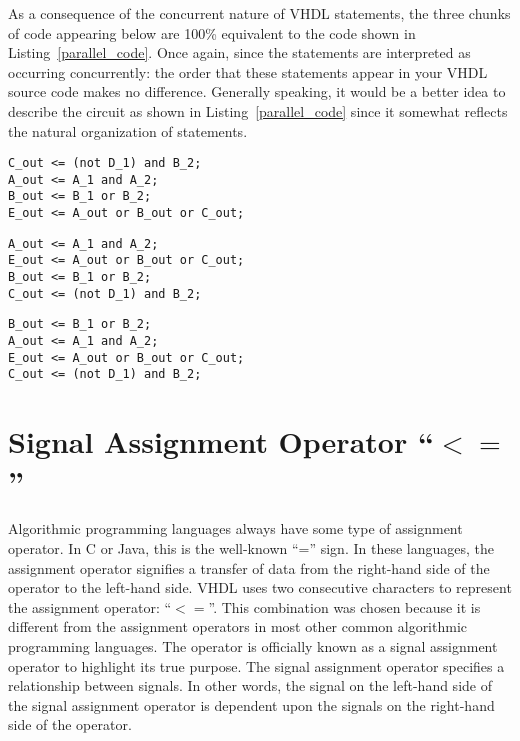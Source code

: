 As a consequence of the concurrent nature of VHDL statements, the three chunks of code appearing below are 100\% equivalent to the code shown in Listing~\ref{parallel_code}. Once again, since the statements are interpreted as occurring concurrently: the order that these statements appear in your VHDL source code makes no difference. Generally speaking, it would be a better idea to describe the circuit as shown in Listing~\ref{parallel_code} since it somewhat reflects the natural organization of statements.

\noindent
\begin{minipage}{0.99\linewidth}
\begin{lstlisting}[label=parallel_code_2, caption=Equivalent VHDL code for the circuit of Figure 4.1. ]
C_out <= (not D_1) and B_2;
A_out <= A_1 and A_2;
B_out <= B_1 or B_2;
E_out <= A_out or B_out or C_out;
\end{lstlisting}
\begin{lstlisting}[label=parallel_code_3, caption=Equivalent VHDL code for the circuit of Figure 4.1.]
A_out <= A_1 and A_2;
E_out <= A_out or B_out or C_out;
B_out <= B_1 or B_2;
C_out <= (not D_1) and B_2;
\end{lstlisting}
\begin{lstlisting}[label=parallel_code_4, caption=Equivalent VHDL code for the circuit of Figure 4.1.]
B_out <= B_1 or B_2;
A_out <= A_1 and A_2;
E_out <= A_out or B_out or C_out;
C_out <= (not D_1) and B_2;
\end{lstlisting}
\end{minipage}

\section{Signal Assignment Operator \texorpdfstring{``$<=$''}{<=}}
Algorithmic programming languages always have some type of assignment operator. In C or Java, this is the well-known ``='' sign. In these languages, the assignment operator signifies a transfer of data from the right-hand side of the operator to the left-hand side. VHDL uses two consecutive characters to represent the assignment operator: ``\texttt{$<=$}''. This combination was chosen because it is different from the assignment operators in most other common algorithmic programming languages. The operator is officially known as a signal assignment operator to highlight its true purpose. The signal assignment operator specifies a relationship between signals. In other words, the signal on the left-hand side of the signal assignment operator is dependent upon the signals on the right-hand side of the operator.

